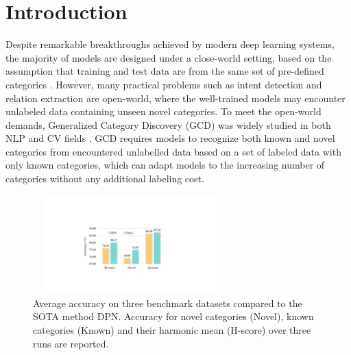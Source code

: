 \documentclass[letterpaper]{article} %
\begin{document}
\section{Introduction}
Despite remarkable breakthroughs achieved by modern deep learning systems, the majority of models are designed under a close-world setting, based on the assumption that training and test data are from the same set of pre-defined categories \citep{openworld}. However, many practical problems such as intent detection \citep{thu2020} and relation extraction \citep{hogan2023open} are open-world, where the well-trained models may encounter unlabeled data containing unseen novel categories.
To meet the open-world demands, Generalized Category Discovery (GCD) was widely studied in both NLP \citep{thu2021,dpn} and CV fields \citep{gcd,simple}.
GCD requires models to recognize both known and novel categories from encountered unlabelled data based on a set of labeled data with only known categories, which can adapt models to the increasing number of categories without any additional labeling cost.

\begin{figure}
\centering
\includegraphics[width=7.5cm, height=3.8cm]{intro.pdf}
\caption{Average accuracy on three benchmark datasets compared to the SOTA method DPN. Accuracy for novel categories (Novel), known categories (Known) and their harmonic mean (H-score) over three runs are reported.}
\label{fig1}
\end{figure}
\end{document}
